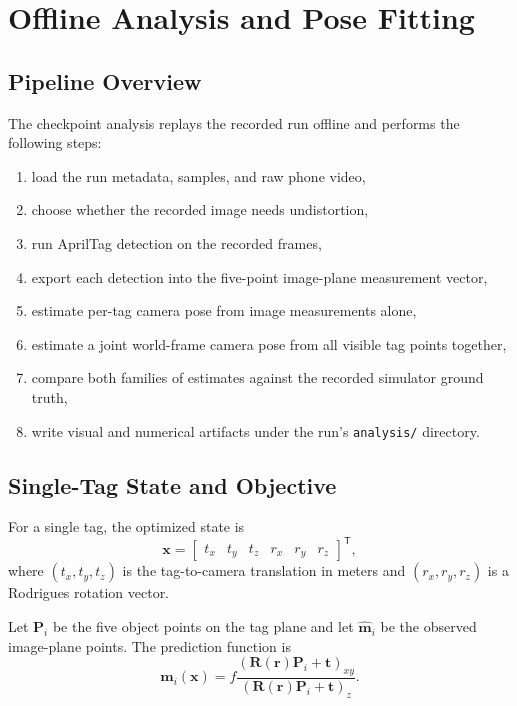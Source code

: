 \documentclass[11pt,a4paper]{article}
\begin{document}
\section{Offline Analysis and Pose Fitting}

\subsection{Pipeline Overview}

The checkpoint analysis replays the recorded run offline and performs the following steps:

\begin{enumerate}
  \item load the run metadata, samples, and raw phone video,
  \item choose whether the recorded image needs undistortion,
  \item run AprilTag detection on the recorded frames,
  \item export each detection into the five-point image-plane measurement vector,
  \item estimate per-tag camera pose from image measurements alone,
  \item estimate a joint world-frame camera pose from all visible tag points together,
  \item compare both families of estimates against the recorded simulator ground truth,
  \item write visual and numerical artifacts under the run's \texttt{analysis/} directory.
\end{enumerate}

\subsection{Single-Tag State and Objective}

For a single tag, the optimized state is
\[
\mathbf{x} =
\begin{bmatrix}
t_x & t_y & t_z & r_x & r_y & r_z
\end{bmatrix}^{\mathsf{T}},
\]
where $(t_x, t_y, t_z)$ is the tag-to-camera translation in meters and $(r_x, r_y, r_z)$ is a Rodrigues rotation vector.

Let $\mathbf{P}_i$ be the five object points on the tag plane and let $\hat{\mathbf{m}}_i$ be the observed image-plane points.
The prediction function is
\[
\mathbf{m}_i(\mathbf{x}) =
f
\frac{
\left(\mathbf{R}(\mathbf{r})\mathbf{P}_i + \mathbf{t}\right)_{xy}
}{
\left(\mathbf{R}(\mathbf{r})\mathbf{P}_i + \mathbf{t}\right)_{z}
}.
\]
\end{document}
